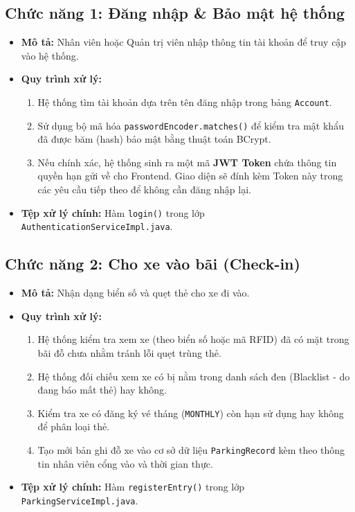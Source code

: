 \documentclass[12pt,a4paper]{article}
\begin{document}
\subsection{Chức năng 1: Đăng nhập \& Bảo mật hệ thống}
\begin{itemize}
    \item \textbf{Mô tả:} Nhân viên hoặc Quản trị viên nhập thông tin tài khoản để truy cập vào hệ thống.
    \item \textbf{Quy trình xử lý:}
    \begin{enumerate}
        \item Hệ thống tìm tài khoản dựa trên tên đăng nhập trong bảng \texttt{Account}.
        \item Sử dụng bộ mã hóa \texttt{passwordEncoder.matches()} để kiểm tra mật khẩu đã được băm (hash) bảo mật bằng thuật toán BCrypt.
        \item Nếu chính xác, hệ thống sinh ra một mã \textbf{JWT Token} chứa thông tin quyền hạn gửi về cho Frontend. Giao diện sẽ đính kèm Token này trong các yêu cầu tiếp theo để không cần đăng nhập lại.
    \end{enumerate}
    \item \textbf{Tệp xử lý chính:} Hàm \texttt{login()} trong lớp \texttt{AuthenticationServiceImpl.java}.
\end{itemize}

\subsection{Chức năng 2: Cho xe vào bãi (Check-in)}
\begin{itemize}
    \item \textbf{Mô tả:} Nhận dạng biển số và quẹt thẻ cho xe đi vào.
    \item \textbf{Quy trình xử lý:}
    \begin{enumerate}
        \item Hệ thống kiểm tra xem xe (theo biển số hoặc mã RFID) đã có mặt trong bãi đỗ chưa nhằm tránh lỗi quẹt trùng thẻ.
        \item Hệ thống đối chiếu xem xe có bị nằm trong danh sách đen (Blacklist - do đang báo mất thẻ) hay không.
        \item Kiểm tra xe có đăng ký vé tháng (\texttt{MONTHLY}) còn hạn sử dụng hay không để phân loại thẻ.
        \item Tạo mới bản ghi đỗ xe vào cơ sở dữ liệu \texttt{ParkingRecord} kèm theo thông tin nhân viên cổng vào và thời gian thực.
    \end{enumerate}
    \item \textbf{Tệp xử lý chính:} Hàm \texttt{registerEntry()} trong lớp \texttt{ParkingServiceImpl.java}.
\end{itemize}
\end{document}
